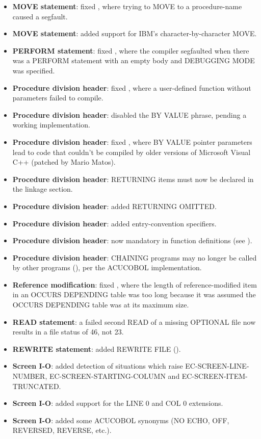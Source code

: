 \begin{itemize}
\item \textbf{MOVE statement}: fixed , where trying to MOVE to a procedure-name caused a segfault.
\item \textbf{MOVE statement}: added support for IBM's character-by-character MOVE.
\item \textbf{PERFORM statement}: fixed , where the compiler segfaulted when there was a PERFORM statement with an empty body and DEBUGGING MODE was specified.
\item \textbf{Procedure division header}: fixed , where a user-defined function without parameters failed to compile.
\item \textbf{Procedure division header}: disabled the BY VALUE phrase, pending a working implementation.
\item \textbf{Procedure division header}: fixed , where BY VALUE pointer parameters lead to code that couldn't be compiled by older versions of Microsoft Visual C++ (patched by Mario Matos).
\item \textbf{Procedure division header}: RETURNING items must now be declared in the linkage section.
\item \textbf{Procedure division header}: added RETURNING OMITTED.
\item \textbf{Procedure division header}: added entry-convention specifiers.
\item \textbf{Procedure division header}: now mandatory in function definitions (see ).
\item \textbf{Procedure division header}: CHAINING programs may no longer be called by other programs (), per the ACUCOBOL implementation.
\item \textbf{Reference modification}: fixed , where the length of reference-modified item in an OCCURS DEPENDING table was too long because it was assumed the OCCURS DEPENDING table was at its maximum size.
\item \textbf{READ statement}: a failed second READ of a missing OPTIONAL file now results in a file status of 46, not 23.
\item \textbf{REWRITE statement}: added REWRITE FILE ().
\item \textbf{Screen I-O}: added detection of situations which raise EC-SCREEN-LINE-NUMBER, EC-SCREEN-STARTING-COLUMN and EC-SCREEN-ITEM-TRUNCATED.
\item \textbf{Screen I-O}: added support for the LINE 0 and COL 0 extensions.
\item \textbf{Screen I-O}: added some ACUCOBOL synonyms (NO ECHO, OFF, REVERSED, REVERSE, etc.).

\end{itemize}
